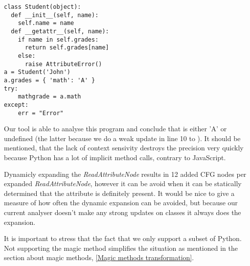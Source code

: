 \begin{listing}[H]
	\begin{verbatim}
class Student(object):
  def __init__(self, name):
    self.name = name
  def __getattr__(self, name):
    if name in self.grades:
      return self.grades[name]
    else:
      raise AttributeError()
a = Student('John')
a.grades = { 'math': 'A' }
try:
	mathgrade = a.math
except:
	err = "Error"
	\end{verbatim}
\end{listing}

Our tool is able to analyse this program and conclude that  is either 'A' or undefined (the latter because we do a weak update in line 10 to ). It should be mentioned, that the lack of context sensivity destroys the precision very quickly because Python has a lot of implicit method calls, contrary to JavaScript.

Dynamicly expanding the \textit{ReadAttributeNode} results in 12 added CFG nodes per expanded \textit{ReadAttributeNode}, however it can be avoid when it can be statically determined that the attribute is definitely present. It would be nice to give a measure of how often the dynamic expansion can be avoided, but because our current analyser doesn't make any strong updates on classes it always does the expansion.

It is important to stress that the fact that we only support a subset of Python. Not supporting the magic method  simplifies the situation as  mentioned in the section about magic methods, \ref{Magic methods transformation}.


